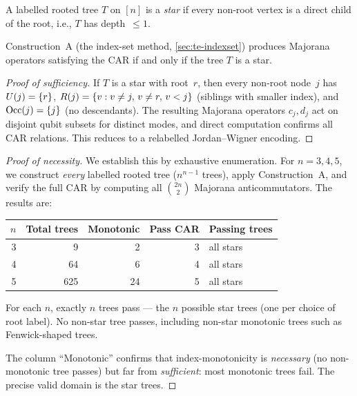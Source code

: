 \begin{definition}
\label{def:star}
A labelled rooted tree $T$ on $[n]$ is a \emph{star} if every
non-root vertex is a direct child of the root, i.e., $T$ has
depth~$\le 1$.
\end{definition}

\begin{theorem}
\label{thm:monotonicity}
Construction~A (the index-set method, \cref{sec:te-indexset}) produces
Majorana operators satisfying the CAR if and only if the tree $T$ is a
star.
\end{theorem}

\begin{proof}[Proof of sufficiency]
If $T$ is a star with root~$r$, then every non-root node~$j$ has
$U(j) = \{r\}$, $R(j) = \{v : v \neq j,\, v \neq r,\, v < j\}$
(siblings with smaller index), and $\mathrm{Occ}(j) = \{j\}$ (no descendants).
The resulting Majorana operators $c_j, d_j$ act on disjoint qubit
subsets for distinct modes, and direct computation confirms all CAR
relations.  This reduces to a relabelled Jordan--Wigner encoding.
\end{proof}

\begin{proof}[Proof of necessity]
We establish this by exhaustive enumeration.  For $n = 3, 4, 5$, we
construct \emph{every} labelled rooted tree ($n^{n-1}$ trees), apply
Construction~A, and verify the full CAR by computing all
$\binom{2n}{2}$ Majorana anticommutators.  The results are:

\begin{center}
\begin{tabular}{@{}rrrrl@{}}
\toprule
$n$ & Total trees & Monotonic & Pass CAR & Passing trees \\
\midrule
3 &     9 &  2 & 3 & all stars \\
4 &    64 &  6 & 4 & all stars \\
5 &   625 & 24 & 5 & all stars \\
\bottomrule
\end{tabular}
\end{center}

For each $n$, exactly $n$ trees pass --- the $n$ possible star trees
(one per choice of root label).  No non-star tree passes, including
non-star monotonic trees such as Fenwick-shaped trees.

The column ``Monotonic'' confirms that index-monotonicity is
\emph{necessary} (no non-monotonic tree passes) but far from
\emph{sufficient}: most monotonic trees fail.  The precise valid
domain is the star trees.
\end{proof}

